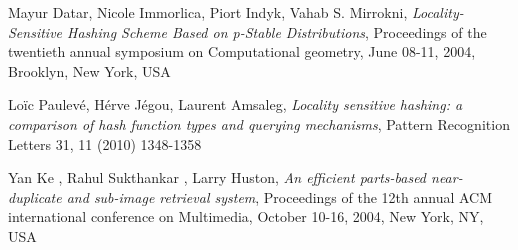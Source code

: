 \documentclass[journal]{IEEEtran}
\begin{document}


\begin{thebibliography}{1}

  
Mayur Datar, Nicole Immorlica, Piort Indyk, Vahab S. Mirrokni, \emph{Locality-Sensitive Hashing Scheme Based on p-Stable Distributions}, Proceedings of the twentieth annual symposium on Computational geometry, June 08-11, 2004, Brooklyn, New York, USA

Lo\"{i}c Paulev\'{e}, H\'{e}rve J\'{e}gou, Laurent Amsaleg, \emph{Locality sensitive hashing: a comparison of hash function types and querying mechanisms}, Pattern Recognition Letters 31, 11 (2010) 1348-1358

Yan Ke , Rahul Sukthankar , Larry Huston, \emph{An efficient parts-based near-duplicate and sub-image retrieval system}, Proceedings of the 12th annual ACM international conference on Multimedia, October 10-16, 2004, New York, NY, USA 

\end{thebibliography}
%
%

\end{document}
